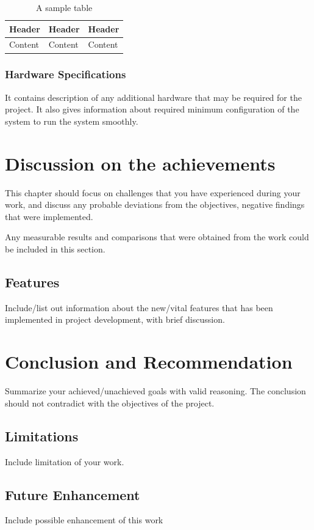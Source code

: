 \documentclass{projectreport}
\begin{document}
	\begin{table}[h!]
		\caption{A sample table}
		\label{table:sample}
		\centering
		\begin{tabular}{|l|l|l|}
			\hline
			\textbf{Header} & \textbf{Header} & \textbf{Header}\\ \hline
			Content & Content & Content \\ \hline
		\end{tabular}
	\end{table}
	
	\subsection{Hardware Specifications}
	It contains description of any additional hardware that may be required for the project. It also gives information about required minimum configuration of the system to run the system smoothly.
	
	
	\chapter{Discussion on the achievements}
	This chapter should focus on challenges that you have experienced during your work, and discuss any probable deviations from the objectives, negative findings that were implemented.
	
	Any measurable results and comparisons that were obtained from the work could be included in this section.
	
	\section{Features}
	Include/list out information about the new/vital features that has been implemented in project development, with brief discussion.
	
	\chapter{Conclusion and Recommendation}
	Summarize your achieved/unachieved goals with valid reasoning. The conclusion should not contradict with the objectives of the project.
	
	\section{Limitations}
	Include limitation of your work.
	
	
	\section{Future Enhancement}
	Include possible enhancement of this work
	
	
	
	
\end{document}
